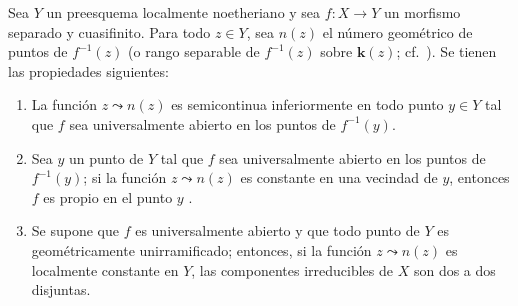 \begin{proposition}[15.5.1]
\label{IV.15.5.1}
Sea $Y$ un preesquema localmente noetheriano y sea $f:X\to Y$ un morfismo separado y cuasifinito.
Para todo $z\in Y$, sea $n(z)$ el número geométrico de puntos de $f^{-1}(z)$ \textup{(o} rango separable \textup{de} $f^{-1}(z)$ \textup{sobre} $\boldsymbol{k}(z)$\textup{; cf.\ )}.
Se tienen las propiedades siguientes:
\begin{enumerate}[label=(\roman*)]
  \item La función $z\leadsto n(z)$ es semicontinua inferiormente en todo punto $y\in Y$ tal que $f$ sea universalmente abierto en los puntos de $f^{-1}(y)$.
  \item Sea $y$ un punto de $Y$ tal que $f$ sea universalmente abierto en los puntos de $f^{-1}(y)$; si la función $z\leadsto n(z)$ es constante en una vecindad de $y$, entonces $f$ es propio en el punto $y$ .
  \item Se supone que $f$ es universalmente abierto y que todo punto de $Y$ es geométricamente unirramificado; entonces, si la función $z\leadsto n(z)$ es localmente constante en $Y$, las componentes irreducibles de $X$ son dos a dos disjuntas.
\end{enumerate}
\end{proposition}

